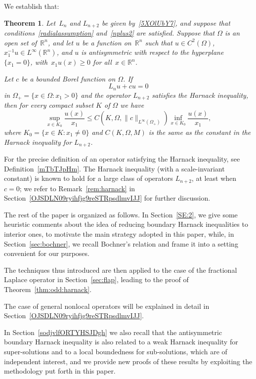 \documentclass[a4paper,12pt,reqno]{amsart}
\numberwithin{equation}{section}
\newtheorem{theorem}{Theorem}[section]
\theoremstyle{definition}
\theoremstyle{notation}
\newcommand{\R}{\mathds{R}}
\renewcommand{\le}{\leqslant}
\begin{document}
We establish that:


\begin{theorem}\label{THM5.55}
Let~$L_n$ and $L_{n + 2}$ be given by~\eqref{5XOlUbY7}, and suppose that conditions~\eqref{radialassumption} and~\eqref{nplus2} are satisfied. Suppose that $\Omega$ is an open set of~$\R^n$, and let $u$ be a function on~$\R^n$ such that $u\in C^{2}(\Omega)$, $x_1^{-1} u \in L^\infty(\R^n)$, and $u$ is antisymmetric with respect to the hyperplane~$\{x_1=0\}$,
with~$x_1u(x) \geqslant 0$ for all~$x\in \R^n$.


Let $c$ be a bounded Borel function on $\Omega$. If
\[
L_n u + c u = 0
\]
in $\Omega_+ = \{x \in \Omega : x_1 > 0\}$ and the operator $L_{n+2}$ satisfies the Harnack inequality, then for every compact subset $K$ of $\Omega$ we have
\begin{equation}
\label{eq:odd:harnack-general}
 \sup_{x \in K_0} \frac{u(x)}{x_1} \le C(K, \Omega, \|c\|_{L^\infty(\Omega_+)}) \inf_{x \in K_0} \frac{u(x)}{x_1} ,
\end{equation}
where $K_0 = \{x \in K : x_1 \ne 0\}$ and $C(K, \Omega, M)$ is the same as the constant in the Harnack inequality for $L_{n + 2}$.
\end{theorem}
For the precise definition of an operator satisfying the Harnack inequality, see Definition~\ref{mTbTJpHm}. The Harnack inequality (with a scale-invariant constant) is known to hold for a large class of operators $L_{n + 2}$, at least when $c = 0$; we refer to Remark~\ref{rem:harnack} in Section~\ref{OJSDLN09ryihfjg9reSTRpsdlmvIJJ} for further discussion.


The rest of the paper is organized as follows. In Section~\ref{SE:2}, we give some heuristic comments about the idea of reducing boundary Harnack inequalities to interior ones, to motivate the main strategy adopted in this paper, while, in Section~\ref{sec:bochner},
we recall Bochner's relation and frame it into a setting convenient for our purposes.


The techniques thus introduced are then applied to the case of the fractional Laplace operator in Section~\ref{sec:flap}, leading to the proof of Theorem~\ref{thm:odd:harnack}.


The case of general nonlocal operators will be explained in detail in Section~\ref{OJSDLN09ryihfjg9reSTRpsdlmvIJJ}.


In Section~\ref{sodjvlfORTYHSJDgh} we also recall that
the antisymmetric boundary
Harnack inequality is also related to a weak Harnack inequality for super-solutions and to a local boundedness for sub-solutions, which are of independent interest,
and we provide new proofs of these results by exploiting the methodology put forth in this paper.
\end{document}
